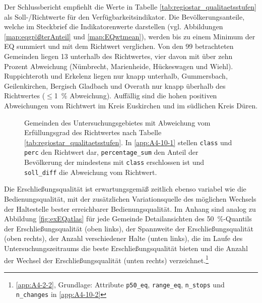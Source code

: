 \documentclass[11pt,pdftex,a4paper]{scrartcl}
\begin{document}
	\begin{table}[htbp]
		\centering
		\fontsize{9}{10}\selectfont
		\makebox[\textwidth][c]{%
			
		}
		\caption[Richt-/Sollwerte zur Erschließungsqualität je RegioStaR7-Raumtyp nach \parencite[124, Tabelle 5-3]{kcwgmbhMethodikUndEmpfehlungen2024}]{Richt-/Sollwerte zur Erschließungsqualität nach \parencite[124, Tabelle 5-3]{kcwgmbhMethodikUndEmpfehlungen2024}. Eine Gemeinde erfüllt den Sollwert, wenn der Anteil der mindestens mit der Qualitätsstufe abhängig vom RegioStaR7-Raumtyp erschlossenen Bevölkerung mindestens dem Erfüllungsgrad entspricht.}
		\label{tab:regiostar_qualitaetsstufen}
	\end{table}
	
	Der Schlussbericht empfiehlt die Werte in Tabelle \ref{tab:regiostar_qualitaetsstufen} als Soll-/Richtwerte für den Verfügbarkeitsindikator. Die Bevölkerungsanteile, welche im Steckbrief die Indikatorenwerte darstellen (vgl. Abbildungen \ref{map:eqgrößterAnteil} und \ref{map:EQwtmean}), werden bis zu einem Minimum der EQ summiert und mit dem Richtwert verglichen. Von den 99 betrachteten Gemeinden liegen 13 unterhalb des Richtwertes, vier davon mit über zehn Prozent Abweichung (Nümbrecht, Marienheide, Hückeswagen und Wiehl). Ruppichteroth und Erkelenz liegen nur knapp unterhalb, Gummersbach, Geilenkirchen, Bergisch Gladbach und Overath nur knapp überhalb des Richtwertes ($\leq$\SI{1}{\percent} Abweichung). Auffällig sind die hohen positiven Abweichungen vom Richtwert im Kreis Euskirchen und im südlichen Kreis Düren. 
	 
	\begin{figure}[!htb]
		
		\caption{Gemeinden des Untersuchungsgebietes mit Abweichung vom Erfüllungsgrad des Richtwertes nach Tabelle \ref{tab:regiostar_qualitaetsstufen}. In \ref{app:A4-10-1} stellen \texttt{class} und \texttt{perc} den Richtwert dar, \texttt{percentage\_sum} den Anteil der Bevölkerung der mindestens mit \texttt{class} erschlossen ist und \texttt{soll\_diff} die Abweichung vom Richtwert.}
		\label{map:deviationsollwert}
	\end{figure}
	
	
	Die Erschließungsqualität ist erwartungsgemäß zeitlich ebenso variabel wie die Bedienungsqualität, mit der zusätzlichen Variationsquelle des möglichen Wechsels der Haltestelle bester erreichbarer Bedienungsqualität. Im Anhang sind analog zu Abbildung \ref{fig:exEQatlas} für jede Gemeinde Detailansichten des \SI{50}{\percent}-Quantils der Erschließungsqualität (oben links), der Spannweite der Erschließungsqualität (oben rechts), der Anzahl verschiedener Halte (unten links), die im Laufe des Untersuchungszeitraums die beste Erschließungsqualität bieten und die Anzahl der Wechsel der Erschließungsqualität (unten rechts) verzeichnet.\footnote{\ref{app:A4-2-2}, Grundlage: Attribute \texttt{p50\_eq}, \texttt{range\_eq}, \texttt{n\_stops} und \texttt{n\_changes} in \ref{app:A4-10-2}}
	
\end{document}
